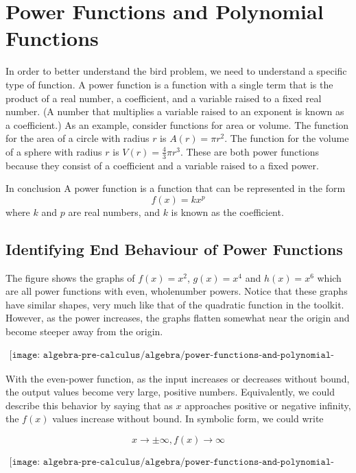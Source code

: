 \section{Power Functions and Polynomial Functions}
In order to better understand the bird problem, we need to understand a specific type of function. A power function is a
function with a single term that is the product of a real number, a coefficient, and a variable raised to a fixed real
number. (A number that multiplies a variable raised to an exponent is known as a coefficient.)
As an example, consider functions for area or volume. The function for the area of a circle with radius $r$ is
$A(r) = \pi r^2$. The function for the volume of a sphere with radius $r$ is $V(r) = \frac{4}{3} \pi r^3$. These are both power
functions because they consist of a coefficient and a variable raised to a fixed power. 

In conclusion A power function is a function that can be represented in the form $$f(x)=kx^p$$ where $k$ and $p$ are real numbers, and $k$ is known as the coefficient.

\subsection{Identifying End Behaviour of Power Functions}
The figure shows the graphs of $f(x)=x^2$, $g(x)=x^4$ and $h(x)=x^6$ which are all power functions with even, wholenumber powers. Notice that these graphs have similar shapes, very much like that of the quadratic function in the
toolkit. However, as the power increases, the graphs flatten somewhat near the origin and become steeper away from
the origin.

\begin{align*}
    \texttt{[image: algebra-pre-calculus/algebra/power-functions-and-polynomial-functions/even\_power\_functions.png]}
\end{align*} \break

With the even-power function, as the input increases or decreases without bound, the output values become very large,
positive numbers. Equivalently, we could describe this behavior by saying that as $x$ approaches positive or negative
infinity, the $f(x)$ values increase without bound. In symbolic form, we could write

$$ x\rightarrow \pm \infty, f(x)\rightarrow \infty$$

\begin{align*}
    \texttt{[image: algebra-pre-calculus/algebra/power-functions-and-polynomial-functions/odd\_power\_functions.png]}
\end{align*} \break

